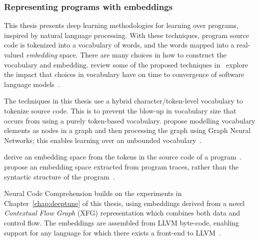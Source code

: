 \subsubsection{Representing programs with embeddings}

This thesis presents deep learning methodologies for learning over programs, inspired by natural language processing. With these techniques, program source code is tokenized into a vocabulary of words, and the words mapped into a real-valued \emph{embedding} space.
There are many choices in how to construct the vocabulary and embedding. \citeauthor{Allamanis2017a} review some of the proposed techniques in~\cite{Allamanis2017a}
\citeauthor{Babii} explore the impact that choices in vocabulary have on time to convergence of software language models~\cite{Babii}.

The techniques in this thesis use a hybrid character/token-level vocabulary to tokenize source code. This is to prevent the blow-up in vocabulary size that occurs from using a purely token-based vocabulary. \citeauthor{Cvitkovic2018a} propose modelling vocabulary elements as nodes in a graph and then processing the graph using Graph Neural Networks; this enables learning over an unbounded vocabulary~\cite{Cvitkovic2018a}.

\citeauthor{Mou2016} derive an embedding space from the tokens in the source code of a program~\cite{Mou2016}.
\citeauthor{Wang2017d} propose an embedding space extracted from program traces, rather than the syntactic structure of the program~\cite{Wang2017d}.

Neural Code Comprehension builds on the experiments in Chapter~\ref{chap:deeptune} of this thesis, using embeddings derived from a novel \emph{Contextual Flow Graph} (XFG) representation which combines both data and control flow. The embeddings are assembled from LLVM byte-code, enabling support for any language for which there exists a front-end to LLVM~\cite{Ben-nun2018}.

